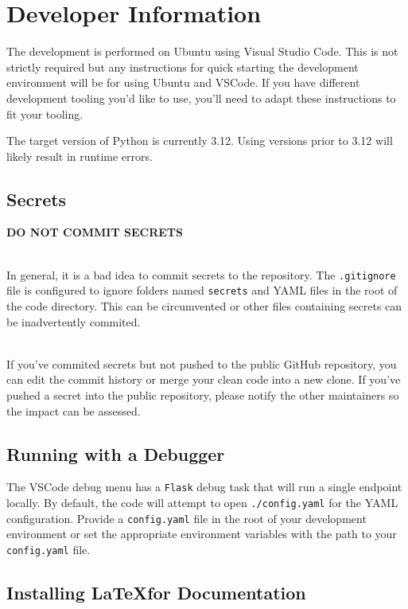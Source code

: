 \chapter{\cxoneflow Developer Information}

The development is performed on Ubuntu using Visual Studio Code.  This is not 
strictly required but any instructions for quick starting the development environment 
will be for using Ubuntu and VSCode. If you have different development tooling you'd like
to use, you'll need to adapt these instructions to fit your tooling.

The target version of Python is currently 3.12.  Using versions prior to 3.12 will likely result in
runtime errors.

\section{Secrets}

\textbf{DO NOT COMMIT SECRETS}

\noindent\\In general, it is a bad idea to commit secrets to the repository.  The \texttt{.gitignore} file is configured
to ignore folders named \texttt{secrets} and YAML files in the root of the code directory.  This 
can be circumvented or other files containing secrets can be inadvertently commited.

\noindent\\If you've commited secrets but not pushed to the public GitHub repository, you can edit the commit history
or merge your clean code into a new clone.  If you've pushed a secret into the public repository, please notify
the other maintainers so the impact can be assessed.

\section{Running with a Debugger}

The VSCode debug menu has a \texttt{Flask} debug task that will run a single endpoint locally.  By default,
the code will attempt to open \texttt{./config.yaml} for the YAML configuration.  Provide a
\texttt{config.yaml} file in the root of your development environment or set the appropriate environment
variables with the path to your \texttt{config.yaml} file.


\section{Installing \LaTeX\space for Documentation}

